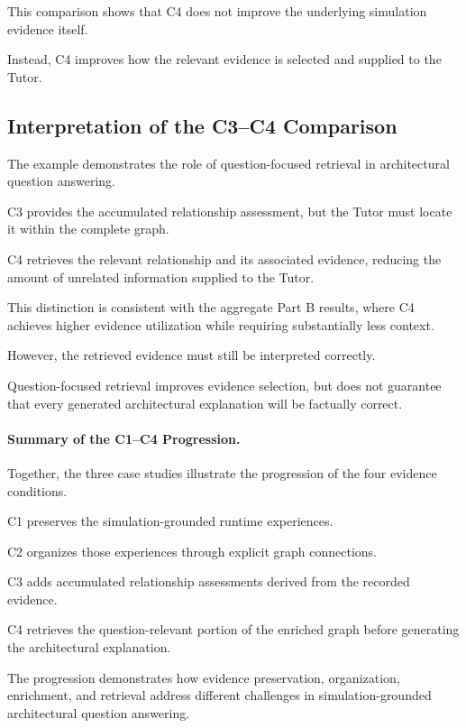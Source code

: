 This comparison shows
that C4 does not improve
the underlying simulation
evidence itself.

Instead, C4 improves
how the relevant evidence
is selected and supplied
to the Tutor.


\subsection{Interpretation of the C3--C4 Comparison}

The example demonstrates
the role of question-focused
retrieval in architectural
question answering.

C3 provides the accumulated
relationship assessment,
but the Tutor must locate
it within the complete graph.

C4 retrieves the relevant
relationship and its
associated evidence,
reducing the amount of
unrelated information
supplied to the Tutor.

This distinction is
consistent with the
aggregate Part B results,
where C4 achieves higher
evidence utilization
while requiring
substantially less context.

However, the retrieved
evidence must still
be interpreted correctly.

Question-focused retrieval
improves evidence selection,
but does not guarantee
that every generated
architectural explanation
will be factually correct.

\paragraph{Summary of the C1--C4 Progression.}

Together, the three
case studies illustrate
the progression of the
four evidence conditions.

C1 preserves the
simulation-grounded
runtime experiences.

C2 organizes those
experiences through
explicit graph connections.

C3 adds accumulated
relationship assessments
derived from the
recorded evidence.

C4 retrieves the
question-relevant portion
of the enriched graph
before generating
the architectural explanation.

The progression demonstrates
how evidence preservation,
organization, enrichment,
and retrieval address
different challenges
in simulation-grounded
architectural question answering.


